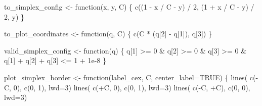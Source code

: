 \documentclass[
  letterpaper,
  DIV=11,
  numbers=noendperiod]{scrartcl}
\newenvironment{Shaded}{\begin{snugshade}}{\end{snugshade}}
\newcommand{\AttributeTok}[1]{\textcolor[rgb]{0.40,0.45,0.13}{#1}}
\newcommand{\ConstantTok}[1]{\textcolor[rgb]{0.56,0.35,0.01}{#1}}
\newcommand{\ControlFlowTok}[1]{\textcolor[rgb]{0.00,0.23,0.31}{#1}}
\newcommand{\DecValTok}[1]{\textcolor[rgb]{0.68,0.00,0.00}{#1}}
\newcommand{\FloatTok}[1]{\textcolor[rgb]{0.68,0.00,0.00}{#1}}
\newcommand{\FunctionTok}[1]{\textcolor[rgb]{0.28,0.35,0.67}{#1}}
\newcommand{\NormalTok}[1]{\textcolor[rgb]{0.00,0.23,0.31}{#1}}
\newcommand{\OtherTok}[1]{\textcolor[rgb]{0.00,0.23,0.31}{#1}}
\newcommand{\SpecialCharTok}[1]{\textcolor[rgb]{0.37,0.37,0.37}{#1}}
\begin{document}
\begin{Shaded}
\begin{Highlighting}[]
\NormalTok{to\_simplex\_config }\OtherTok{\textless{}{-}} \ControlFlowTok{function}\NormalTok{(x, y, C) \{}
  \FunctionTok{c}\NormalTok{((}\DecValTok{1} \SpecialCharTok{{-}}\NormalTok{ x }\SpecialCharTok{/}\NormalTok{ C }\SpecialCharTok{{-}}\NormalTok{ y) }\SpecialCharTok{/} \DecValTok{2}\NormalTok{, (}\DecValTok{1} \SpecialCharTok{+}\NormalTok{ x }\SpecialCharTok{/}\NormalTok{ C }\SpecialCharTok{{-}}\NormalTok{ y) }\SpecialCharTok{/} \DecValTok{2}\NormalTok{, y)}
\NormalTok{\}}

\NormalTok{to\_plot\_coordinates }\OtherTok{\textless{}{-}} \ControlFlowTok{function}\NormalTok{(q, C) \{}
  \FunctionTok{c}\NormalTok{(C }\SpecialCharTok{*}\NormalTok{ (q[}\DecValTok{2}\NormalTok{] }\SpecialCharTok{{-}}\NormalTok{ q[}\DecValTok{1}\NormalTok{]), q[}\DecValTok{3}\NormalTok{])}
\NormalTok{\}}

\NormalTok{valid\_simplex\_config }\OtherTok{\textless{}{-}} \ControlFlowTok{function}\NormalTok{(q) \{}
\NormalTok{  q[}\DecValTok{1}\NormalTok{] }\SpecialCharTok{\textgreater{}=} \DecValTok{0} \SpecialCharTok{\&}\NormalTok{ q[}\DecValTok{2}\NormalTok{] }\SpecialCharTok{\textgreater{}=} \DecValTok{0} \SpecialCharTok{\&}\NormalTok{ q[}\DecValTok{3}\NormalTok{] }\SpecialCharTok{\textgreater{}=} \DecValTok{0} \SpecialCharTok{\&}\NormalTok{ q[}\DecValTok{1}\NormalTok{] }\SpecialCharTok{+}\NormalTok{ q[}\DecValTok{2}\NormalTok{] }\SpecialCharTok{+}\NormalTok{ q[}\DecValTok{3}\NormalTok{] }\SpecialCharTok{\textless{}=} \DecValTok{1} \SpecialCharTok{+} \FloatTok{1e{-}8}
\NormalTok{\}}

\NormalTok{plot\_simplex\_border }\OtherTok{\textless{}{-}} \ControlFlowTok{function}\NormalTok{(label\_cex, C, }\AttributeTok{center\_label=}\ConstantTok{TRUE}\NormalTok{) \{}
  \FunctionTok{lines}\NormalTok{( }\FunctionTok{c}\NormalTok{(}\SpecialCharTok{{-}}\NormalTok{C, }\DecValTok{0}\NormalTok{), }\FunctionTok{c}\NormalTok{(}\DecValTok{0}\NormalTok{, }\DecValTok{1}\NormalTok{), }\AttributeTok{lwd=}\DecValTok{3}\NormalTok{)}
  \FunctionTok{lines}\NormalTok{( }\FunctionTok{c}\NormalTok{(}\SpecialCharTok{+}\NormalTok{C, }\DecValTok{0}\NormalTok{), }\FunctionTok{c}\NormalTok{(}\DecValTok{0}\NormalTok{, }\DecValTok{1}\NormalTok{), }\AttributeTok{lwd=}\DecValTok{3}\NormalTok{)}
  \FunctionTok{lines}\NormalTok{( }\FunctionTok{c}\NormalTok{(}\SpecialCharTok{{-}}\NormalTok{C, }\SpecialCharTok{+}\NormalTok{C), }\FunctionTok{c}\NormalTok{(}\DecValTok{0}\NormalTok{, }\DecValTok{0}\NormalTok{), }\AttributeTok{lwd=}\DecValTok{3}\NormalTok{)}


\end{Highlighting}
\end{Shaded}
\end{document}
